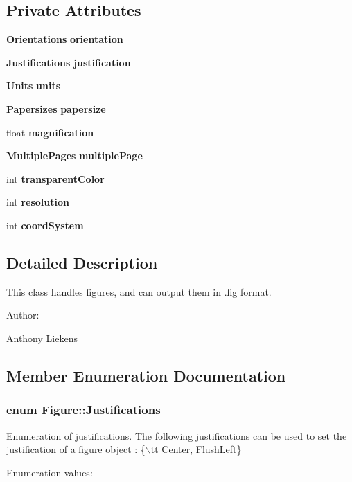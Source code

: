 \subsection*{Private Attributes}
\begin{CompactItemize}
\item 
{\bf Orientations} {\bf orientation}
\item 
{\bf Justifications} {\bf justification}
\item 
{\bf Units} {\bf units}
\item 
{\bf Papersizes} {\bf papersize}
\item 
float {\bf magnification}
\item 
{\bf Multiple\-Pages} {\bf multiple\-Page}
\item 
int {\bf transparent\-Color}
\item 
int {\bf resolution}
\item 
int {\bf coord\-System}
\end{CompactItemize}


\subsection{Detailed Description}
This class handles figures, and can output them in .fig format. \begin{Desc}
\item[Author: ]\par
Anthony Liekens \end{Desc}




\subsection{Member Enumeration Documentation}
\subsubsection{\setlength{\rightskip}{0pt plus 5cm}enum Figure::Justifications}\label{classFigure_s24}


Enumeration of justifications. The following justifications can be used to set the justification of a figure object : \{$\backslash$tt Center, Flush\-Left\} \begin{Desc}
\item[Enumeration values: ]\par
\begin{description}
\item[{\em 
{\em Center}\label{classFigure_s24s2}
}]\item[{\em 
{\em Flush\-Left}\label{classFigure_s24s3}
}]\end{description}
\end{Desc}

